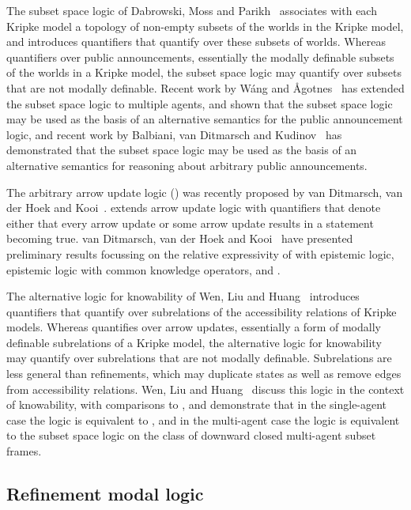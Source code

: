 The subset space logic of Dabrowski, Moss and Parikh~\cite{dabrowski:1996} associates with each Kripke model a topology of non-empty subsets of the worlds in the Kripke model, and introduces quantifiers that quantify over these subsets of worlds.
Whereas \logicApal{} quantifiers over public announcements, essentially the modally definable subsets of the worlds in a Kripke model, the subset space logic may quantify over subsets that are not modally definable.
Recent work by W{\'a}ng and {\AA}gotnes~\cite{wang:2013a,wang:2013b} has extended the subset space logic to multiple agents, and shown that the subset space logic may be used as the basis of an alternative semantics for the public announcement logic, and recent work by Balbiani, van Ditmarsch and Kudinov~\cite{balbiani:2013} has demonstrated that the subset space logic may be used as the basis of an alternative semantics for reasoning about arbitrary public announcements.

The arbitrary arrow update logic (\logicAaul{}) was recently proposed by van Ditmarsch, van der Hoek and Kooi~\cite{vanditmarsch:2014}.
\logicAaul{} extends arrow update logic with quantifiers that denote either that every arrow update or some arrow update results in a statement becoming true. 
van Ditmarsch, van der Hoek and Kooi~\cite{vanditmarsch:2014} have presented preliminary results focussing on the relative expressivity of \logicAaul{} with epistemic logic, epistemic logic with common knowledge operators, and \logicApal{}.

The alternative logic for knowability of Wen, Liu and Huang~\cite{wen:2011} introduces quantifiers that quantify over subrelations of the accessibility relations of Kripke models.
Whereas \logicAaul{} quantifies over arrow updates, essentially a form of modally definable subrelations of a Kripke model, the alternative logic for knowability may quantify over subrelations that are not modally definable.
Subrelations are less general than refinements, which may duplicate states as well as remove edges from accessibility relations.
Wen, Liu and Huang~\cite{wen:2011} discuss this logic in the context of knowability, with comparisons to \logicApal{}, and demonstrate that in the single-agent case the logic is equivalent to \logicApal{}, and in the multi-agent case the logic is equivalent to the subset space logic on the class of downward closed multi-agent subset frames.

\subsection{Refinement modal logic}

